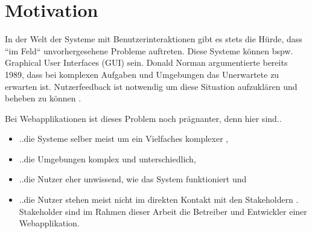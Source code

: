 \section{Motivation}


In der Welt der Systeme mit Benutzerinteraktionen gibt es stets die Hürde, dass ``im Feld`` unvorhergesehene Probleme auftreten. Diese Systeme können bspw. Graphical User Interfaces (GUI) sein. Donald Norman \cite{TheProblemOfAutomation} argumentierte bereits 1989, dass bei komplexen Aufgaben und Umgebungen das Unerwartete zu erwarten ist. Nutzerfeedback ist notwendig um diese Situation aufzuklären und beheben zu können \cite{AnErrorReportingAndFeedbackComponent}.

Bei Webapplikationen ist dieses Problem noch prägnanter, denn hier sind..
\begin{itemize}
	\item ..die Systeme selber meist um ein Vielfaches komplexer \cite{ManagingTheComplexityOfWebSystemsDevelopment},
	\item ..die Umgebungen komplex und unterschiedlich,
	\item ..die Nutzer eher unwissend, wie das System funktioniert \cite{AnErrorReportingAndFeedbackComponent} und
	\item ..die Nutzer stehen meist nicht im direkten Kontakt mit den Stakeholdern \cite{EndUsersAsUnwittingSoftwareDevelopers}. Stakeholder sind im Rahmen dieser Arbeit die Betreiber und Entwickler einer Webapplikation.
\end{itemize}


